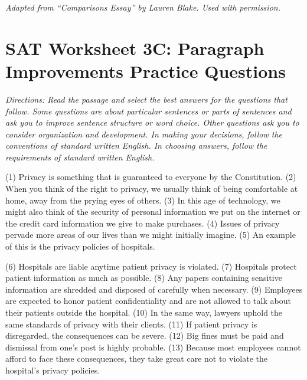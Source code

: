 \begin{spacing}{2}
\begin{linenumbers*}
\end{linenumbers*}
\end{spacing}

\bigskip
\textit{Adapted from ``Comparisons Essay'' by Lauren Blake. Used with permission.}

\vfill
\newpage
\section[Improvement Practice]{SAT Worksheet 3C: Paragraph Improvements Practice Questions}

\bigskip
\textit{Directions: Read the passage and select the best answers for the questions that follow. Some questions are about particular sentences or parts of sentences and ask you to improve sentence structure or word choice. Other questions ask you to consider organization and development. In making your decisions, follow the conventions of standard written English. In choosing answers, follow the requirements of standard written English.}

\bigskip
\indent (1) Privacy is something that is guaranteed to everyone by the Constitution. (2) When you think of the right to privacy, we usually think of being comfortable at home, away from the prying eyes of others. (3) In this age of technology, we might also think of the security of personal information we put on the internet or the credit card information we give to make purchases. (4) Issues of privacy pervade more areas of our lives than we might initially imagine. (5) An example of this is the privacy policies of hospitals.

\indent (6) Hospitals are liable anytime patient privacy is violated. (7) Hospitals protect patient information as much as possible. (8) Any papers containing sensitive information are shredded and disposed of carefully when necessary. (9) Employees are expected to honor patient confidentiality and are not allowed to talk about their patients outside the hospital. (10) In the same way, lawyers uphold the same standards of privacy with their clients. (11) If patient privacy is disregarded, the consequences can be severe. (12) Big fines must be paid and dismissal from one's post is highly probable. (13) Because most employees cannot afford to face these consequences, they take great care not to violate the hospital's privacy policies.

